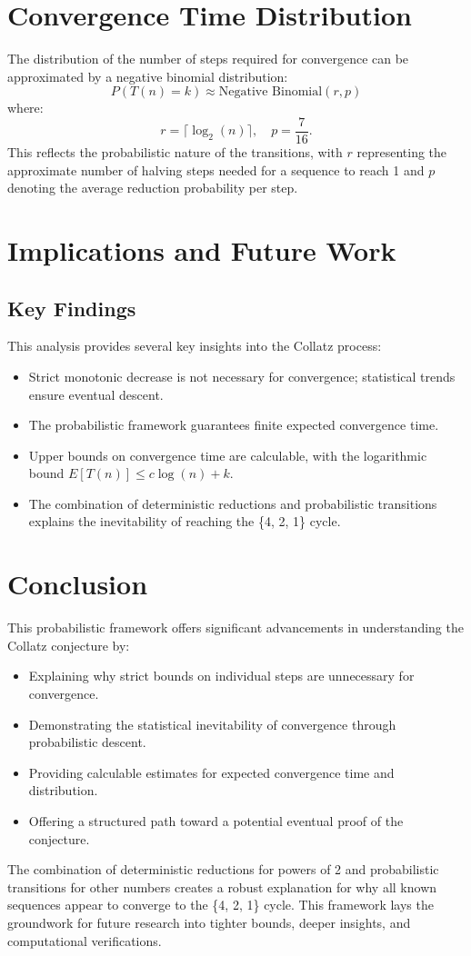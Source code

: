 \section{Convergence Time Distribution}
The distribution of the number of steps required for convergence can be approximated by a negative binomial distribution:
\[
P(T(n) = k) \approx \text{Negative Binomial}(r, p)
\]
where:
\[
r = \lceil \log_2(n) \rceil, \quad p = \frac{7}{16}.
\]
This reflects the probabilistic nature of the transitions, with \( r \) representing the approximate number of halving steps needed for a sequence to reach 1 and \( p \) denoting the average reduction probability per step.

\section{Implications and Future Work}

\subsection{Key Findings}
This analysis provides several key insights into the Collatz process:
\begin{itemize}
    \item Strict monotonic decrease is not necessary for convergence; statistical trends ensure eventual descent.
    \item The probabilistic framework guarantees finite expected convergence time.
    \item Upper bounds on convergence time are calculable, with the logarithmic bound \( E[T(n)] \leq c \log(n) + k \).
    \item The combination of deterministic reductions and probabilistic transitions explains the inevitability of reaching the \{4, 2, 1\} cycle.
\end{itemize}

\section{Conclusion}
This probabilistic framework offers significant advancements in understanding the Collatz conjecture by:
\begin{itemize}
    \item Explaining why strict bounds on individual steps are unnecessary for convergence.
    \item Demonstrating the statistical inevitability of convergence through probabilistic descent.
    \item Providing calculable estimates for expected convergence time and distribution.
    \item Offering a structured path toward a potential eventual proof of the conjecture.
\end{itemize}

The combination of deterministic reductions for powers of 2 and probabilistic transitions for other numbers creates a robust explanation for why all known sequences appear to converge to the \{4, 2, 1\} cycle. This framework lays the groundwork for future research into tighter bounds, deeper insights, and computational verifications.
